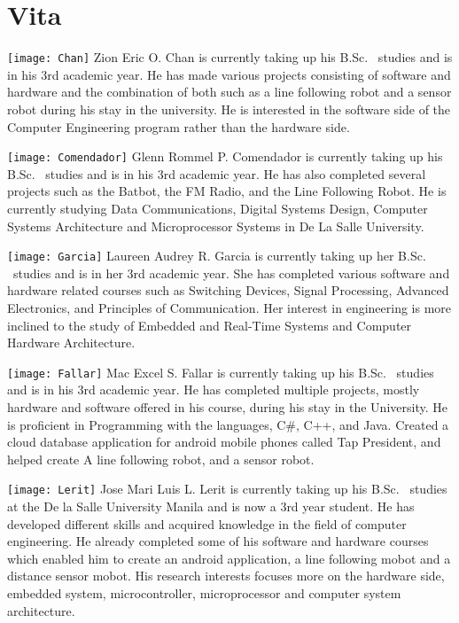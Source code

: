 \chapter{Vita}


{
\vfill

\texttt{[image: Chan]}
 Zion Eric O. Chan is currently taking up his B.Sc. \degree \ studies and is in his 3rd academic year. He has made various projects consisting of software and hardware and the combination of both such as a line following robot and a sensor robot during his stay in the university. He is interested in the software side of the Computer Engineering program rather than the hardware side.
\vspace{5mm}

\texttt{[image: Comendador]}
 Glenn Rommel P. Comendador is currently taking up his B.Sc. \degree \ studies and is in his 3rd academic year. He has also completed several projects such as the Batbot, the FM Radio, and the Line Following Robot. He is currently studying Data Communications, Digital Systems Design, Computer Systems Architecture and Microprocessor Systems in De La Salle University.
\vspace{5mm}

\texttt{[image: Garcia]}
 Laureen Audrey R. Garcia is currently taking up her B.Sc. \degree \ studies and is in her 3rd academic year. She has completed various software and hardware related courses such as Switching Devices, Signal Processing, Advanced Electronics, and Principles of Communication. Her interest in engineering is more inclined to the study of Embedded and Real-Time Systems and Computer Hardware Architecture. 
\vspace{5mm}

\texttt{[image: Fallar]}
 Mac Excel S. Fallar is currently taking up his B.Sc. \degree \ studies and is in his 3rd academic year. He has completed multiple projects, mostly hardware and software offered in his course, during his stay in the University. He is proficient in Programming with the languages, C#, C++, and Java. Created a cloud database application for android mobile phones called Tap President, and helped create A line following robot, and a sensor robot. 
\vspace{5mm}

\texttt{[image: Lerit]}
 Jose Mari Luis L. Lerit is currently taking up his B.Sc. \degree \ studies at the De la Salle University Manila and is now a 3rd year student. He has developed different skills and acquired knowledge in the field of computer engineering. He already completed some of his software and hardware courses which enabled him to create an android application, a line following mobot and a distance sensor mobot. His research interests focuses more on the hardware side, embedded system, microcontroller, microprocessor and computer system architecture.

\vfill
}